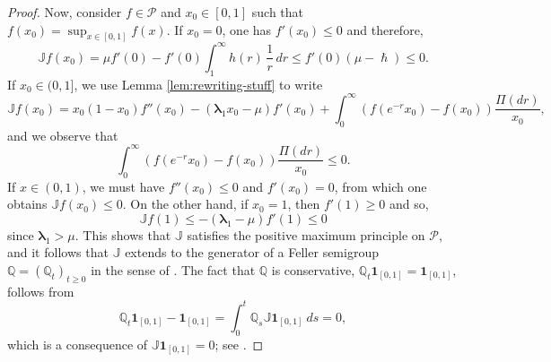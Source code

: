 \documentclass[JEP,XML,SOM,Unicode]{cedram}
\theoremstyle{plain}
\theoremstyle{definition}
\newcommand{\Poly}{\mathscr{P}}
\newcommand{\J}{\mathds{Q}}
\newcommand{\calJ}{\mathds{J}}
\newcommand{\lam}{{\bm{\lambda}_1}}
\let\h\hslash
\let\mo\mu
\begin{document}
\begin{proof}
Now, consider $f \in \Poly$ and $x_0 \in [0,1]$ such that $f(x_0)=\sup_{x\in [0,1]} f(x)$.
If $x_0 = 0$, one has $f'(x_0) \le 0$ and therefore,
\[
\calJ f(x_0) = \mo f'(0) - f'(0) \int_1^{\infty} h(r)\,\frac{1}{r}\, dr \le f'(0) (\mo - \h) \le 0.
\]
If $x_0 \in (0,1]$, we use Lemma \ref{lem:rewriting-stuff} to write\vspace*{-3pt}
\[
\calJ f(x_0) = x_0 (1-x_0)f''(x_0)-\left(\lam x_0-\mo\right)f'(x_0)+\int_{0}^{\infty}\left(f(e^{-r}x_0)-f(x_0)\right) \frac{\Pi(dr)}{x_0},
\]
and we observe that\vspace*{-3pt}
\begin{equation*}
\int_{0}^{\infty} \left(f(e^{-r}x_0)-f(x_0)\right) \frac{\Pi(dr)}{x_0} \leq 0.
\end{equation*}
If $x \in (0,1)$, we must have $f''(x_0)\leq 0$ and $f'(x_0)=0$, from which one obtains $\calJ f(x_0)\leq 0$. On the other hand, if $x_0=1$, then $f'(1)\geq 0$ and so,
\[
\calJ f(1)\leq -\left(\lam-\mo \right)f'(1) \leq 0
\]
since $\lam > \mo$.
This shows that $\calJ$ satisfies the positive maximum principle on $\Poly$, and it follows that $\calJ$ extends to the generator of a Feller semigroup $\J = (\J_t)_{t \geq 0}$ in the sense of \cite[Th.\,1.30]{Levy-Matters-III}. The fact that $\J$ is conservative, \ie $\J_t \bm{1}_{[0,1]} = \bm{1}_{[0,1]}$, follows from
\begin{equation*}
\J_t \bm{1}_{[0,1]} - \bm{1}_{[0,1]} = \int_0^t \J_s \calJ \bm{1}_{[0,1]} \: ds = 0,
\end{equation*}
which is a consequence of $\calJ \bm{1}_{[0,1]} = 0$;
see \eg \cite[Lem.\,1.26]{Levy-Matters-III}.
\end{proof}
\end{document}
